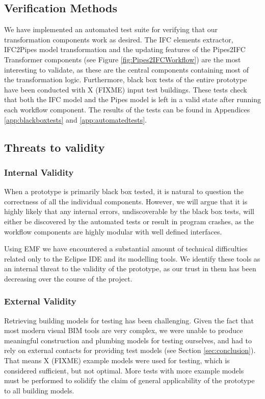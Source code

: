 \subsection{Verification Methods}
\label{subsec:verification_methods}
We have implemented an automated test suite for verifying that our transformation components work as desired. The IFC elements extractor, IFC2Pipes model transformation and the updating features of the Pipes2IFC Transformer components (see Figure \ref{fig:Pipes2IFCWorkflow}) are the most interesting to validate, as these are the central components containing most of the transformation logic. Furthermore, black box tests of the entire prototype have been conducted with X (FIXME) input test buildings. These tests check that both the IFC model and the Pipes model is left in a valid state after running each workflow component. The results of the tests can be found in Appendices \ref{app:blackboxtests} and \ref{app:automatedtests}.

\subsection{Threats to validity}
\subsubsection{Internal Validity} When a prototype is primarily black box tested, it is natural to question the correctness of all the individual components. However, we will argue that it is highly likely that any internal errors, undiscoverable by the black box tests, will either be discovered by the automated tests or result in program crashes, as the workflow components are highly modular with well defined interfaces.

Using EMF we have encountered a substantial amount of technical difficulties related only to the Eclipse IDE and its modelling tools. We identify these tools as an internal threat to the validity of the prototype, as our trust in them has been decreasing over the course of the project.

\subsubsection{External Validity} Retrieving building models for testing has been challenging. Given the fact that most modern visual BIM tools are very complex, we were unable to produce meaningful construction and plumbing models for testing ourselves, and had to rely on external contacts for providing test models (see Section \ref{sec:conclusion}). That means X (FIXME) example models were used for testing, which is considered sufficient, but not optimal. More tests with more example models must be performed to solidify the claim of general applicability of the prototype to all building models.







